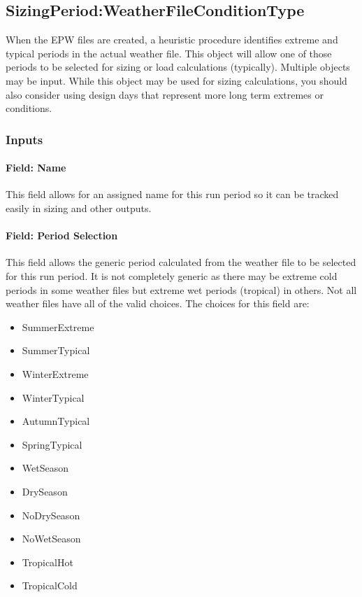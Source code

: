\subsection{Sizing\-Period:\-Weather\-File\-Con\-dition\-Type}\label{sizingperiodweatherfileconditiontype}

When the EPW files are created, a heuristic procedure identifies extreme and typical periods in the actual weather file. This object will allow one of those periods to be selected for sizing or load calculations (typically). Multiple objects may be input. While this object may be used for sizing calculations, you should also consider using design days that represent more long term extremes or conditions.

\subsubsection{Inputs}\label{inputs-3-020}

\paragraph{Field: Name}\label{field-name-3-018}

This field allows for an assigned name for this run period so it can be tracked easily in sizing and other outputs.

\paragraph{Field: Period Selection}\label{field-period-selection}

This field allows the generic period calculated from the weather file to be selected for this run period. It is not completely generic as there may be extreme cold periods in some weather files but extreme wet periods (tropical) in others. Not all weather files have all of the valid choices. The choices for this field are:

\begin{itemize}
\item
  SummerExtreme
\item
  SummerTypical
\item
  WinterExtreme
\item
  WinterTypical
\item
  AutumnTypical
\item
  SpringTypical
\item
  WetSeason
\item
  DrySeason
\item
  NoDrySeason
\item
  NoWetSeason
\item
  TropicalHot
\item
  TropicalCold
\end{itemize}

